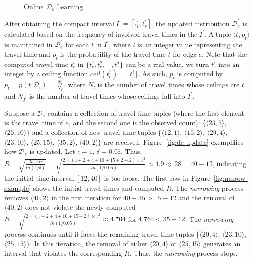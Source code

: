 \documentclass{vldb}
\begin{document}
	\begin{figure*}[!htbp]
		\centering
		\vspace{-5pt}
		\caption{Online $\mathcal{D}_e$ Learning}
		\label{fig:online-learn}  %
		\vspace{-5pt}
	\end{figure*}
	
	After obtaining the compact interval $I^\prime=[t_l^\prime, t_r^\prime]$, the updated distribution $\mathcal{D}_e^\prime$ is calculated based on the frequency of involved travel times in the $I^\prime$. A tuple $\langle t, p_{t}\rangle$ is maintained in $\mathcal{D}_e^\prime$ for each $t$ in $I^\prime$, where $t$ is an integer value representing the travel time and $p_{t}$ is the probability of the travel time $t$ for edge $e$. 
	Note that the computed travel time $t_e^i$ in $\{t_e^1, t_e^2, \cdots, t_e^n\}$ can be a real value, we turn $t_e^i$ into an integer by a ceiling function $ceil(t_e^i)=\lceil t_e^i\rceil$. 
	As such, $p_{t}$ is computed by $p_{t}=p(t|\mathcal{D}_e)=\frac{N_{t}}{N_{I^\prime}}$, where $N_{t}$ is the number of travel times whose ceilings are $t$ and $N_{I^\prime}$ is the number of travel times whose ceilings fall into $I^\prime$.
	
	Suppose a $\mathcal{D}_e$ contains a collection of travel time tuples (where the first element is the travel time of $e$, and the second one is the observed count): $\{\langle 23, 5\rangle$, $\langle 25, 10\rangle\}$ and a collection of new travel time tuples $\{\langle 12,1\rangle$, $\langle 15,2\rangle$, $\langle 20,4\rangle$, $\langle 23,10\rangle$, $\langle 25,15\rangle$, $\langle 35,2\rangle$, $\langle 40,2\rangle\}$ are received, Figure~\ref{fig:de-update} exemplifies how $\mathcal{D}_e$ is updated. 
	Let $\epsilon=1$, $\delta=0.05$. Thus,\\
	$R=\sqrt{\frac{2n\times \epsilon^2}{ln(1/\delta)}}=\sqrt{\frac{2\times (1+2+4+10+15+2+2)\times 1^2}{ln(1/0.05)}}\approx 4.9\ll 28=40-12$, indicating the initial time interval $[12,40]$ is too loose. The first row in Figure~\ref{fig:narrow-example} shows the initial travel times and computed $R$.
	The \textit{narrowing} process removes $\langle 40,2\rangle$ in the first iteration for $40-35>15-12$ and the removal of $\langle 40,2\rangle$ does not violate the newly computed $R=\sqrt{\frac{2\times (1+2+4+10+15+2)\times 1^2}{ln(1/0.05)}}\approx 4.764$ for $4.764<35-12$.
	The \textit{narrowing} process continues until it faces the remaining travel time tuples $\{\langle 20,4\rangle$, $\langle 23,10\rangle$, $\langle 25,15\rangle\}$. In this iteration, the removal of either $\langle 20, 4\rangle$ or $\langle 25,15\rangle$ generates an interval that violates the corresponding $R$. Thus, the \textit{narrowing} process stops.
	
\end{document}
